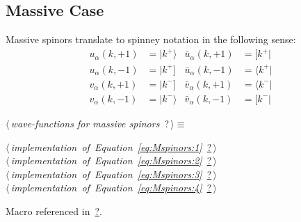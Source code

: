 \documentclass[a4paper,12pt]{amsart}
\newcommand{\bra}[1]{\langle #1 \vert}
\newcommand{\brb}[1]{[ #1 \vert}
\newcommand{\kea}[1]{\vert #1 \rangle}
\newcommand{\keb}[1]{\vert #1 ]}
\renewcommand{\NWtarget}[2]{\hypertarget{#1}{#2}}
\renewcommand{\NWlink}[2]{\hyperlink{#1}{#2}}
\renewcommand{\NWtxtMacroRefIn}{Macro referenced in}
\renewcommand{\NWsep}{${\diamond}$}
\begin{document}
\subsection{Massive Case}
Massive spinors translate to spinney notation in the following
sense:
\begin{subequations}
\begin{align}
u_\alpha(k, +1) &= \kea{k^+} & \bar{u}_\alpha(k, +1) &= \brb{k^+}
\label{eq:Mspinors:1}\\
u_\alpha(k, -1) &= \keb{k^+} & \bar{u}_\alpha(k, -1) &= \bra{k^+}
\label{eq:Mspinors:2}\\
v_\alpha(k, +1) &= \keb{k^-} & \bar{v}_\alpha(k, +1) &= \bra{k^-}
\label{eq:Mspinors:3}\\
v_\alpha(k, -1) &= \kea{k^-} & \bar{v}_\alpha(k, -1) &= \brb{k^-}
\label{eq:Mspinors:4}
\end{align}
\end{subequations}
\begin{flushleft} \small
\begin{minipage}{\linewidth}\label{scrap13}\raggedright\small
\NWtarget{nuweb?}{} $\langle\,${\it wave-functions for massive spinors}\nobreak\ {\footnotesize {?}}$\,\rangle\equiv$
\vspace{-1ex}
\begin{list}{}{} \item
\mbox{}\verb@@\hbox{$\langle\,${\it implementation of Equation~\eqref{eq:Mspinors:1}}\nobreak\ {\footnotesize \NWlink{nuweb?}{?}}$\,\rangle$}\verb@@\\
\mbox{}\verb@@\hbox{$\langle\,${\it implementation of Equation~\eqref{eq:Mspinors:2}}\nobreak\ {\footnotesize \NWlink{nuweb?}{?}}$\,\rangle$}\verb@@\\
\mbox{}\verb@@\hbox{$\langle\,${\it implementation of Equation~\eqref{eq:Mspinors:3}}\nobreak\ {\footnotesize \NWlink{nuweb?}{?}}$\,\rangle$}\verb@@\\
\mbox{}\verb@@\hbox{$\langle\,${\it implementation of Equation~\eqref{eq:Mspinors:4}}\nobreak\ {\footnotesize \NWlink{nuweb?}{?}}$\,\rangle$}\verb@@{\NWsep}
\end{list}
\vspace{-1.5ex}
\footnotesize
\begin{list}{}{\setlength{\itemsep}{-\parsep}\setlength{\itemindent}{-\leftmargin}}
\item \NWtxtMacroRefIn\ \NWlink{nuweb?}{?}.

\item{}
\end{list}
\end{minipage}\vspace{4ex}
\end{flushleft}
\end{document}
